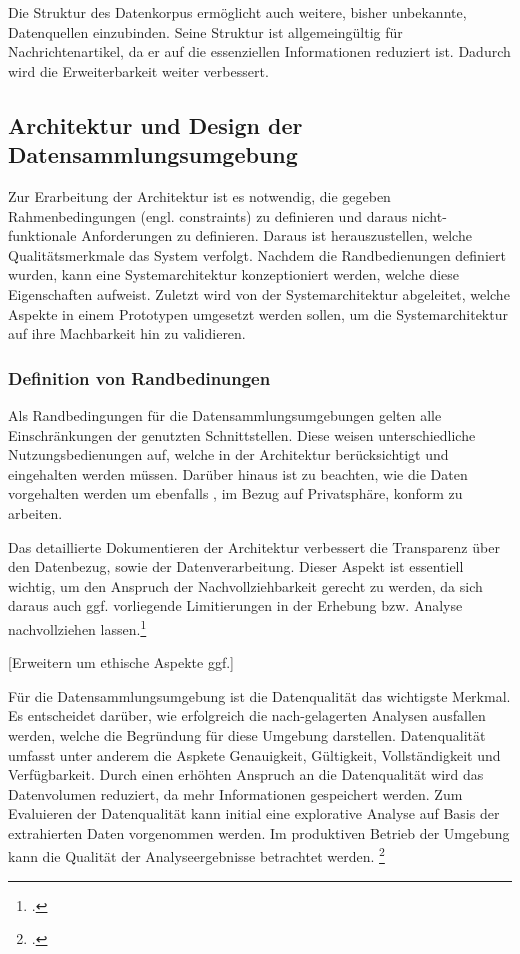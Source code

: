 Die Struktur des Datenkorpus ermöglicht auch weitere, bisher unbekannte, Datenquellen einzubinden. Seine Struktur ist allgemeingültig für Nachrichtenartikel, da er auf die essenziellen Informationen reduziert ist. 
Dadurch wird die Erweiterbarkeit weiter verbessert.

\newpage
\subsection{Architektur und Design der Datensammlungsumgebung}
Zur Erarbeitung der Architektur ist es notwendig, die gegeben Rahmenbedingungen (engl. constraints) zu definieren und daraus nicht- funktionale Anforderungen zu definieren. Daraus ist herauszustellen, welche Qualitätsmerkmale das System verfolgt. 
Nachdem die Randbedienungen definiert wurden, kann eine Systemarchitektur konzeptioniert werden, welche diese Eigenschaften aufweist. 
Zuletzt wird von der Systemarchitektur abgeleitet, welche Aspekte in einem Prototypen umgesetzt werden sollen, um die Systemarchitektur auf ihre Machbarkeit hin zu validieren.

\subsubsection{Definition von Randbedinungen}
Als  Randbedingungen für die Datensammlungsumgebungen gelten alle Einschränkungen der genutzten Schnittstellen. Diese weisen unterschiedliche Nutzungsbedienungen auf, welche in der Architektur berücksichtigt und eingehalten werden müssen. Darüber hinaus ist zu beachten, wie die Daten vorgehalten werden um ebenfalls , im Bezug auf Privatsphäre, konform zu arbeiten. 

Das detaillierte Dokumentieren der Architektur verbessert die Transparenz über den Datenbezug, sowie der Datenverarbeitung. Dieser Aspekt ist essentiell wichtig, um den Anspruch der Nachvollziehbarkeit gerecht zu werden, da sich daraus auch ggf. vorliegende Limitierungen in der Erhebung bzw. Analyse nachvollziehen lassen.\footcite[Vgl.][]{Sayogo.Challenges.2015}{}{}

[Erweitern um ethische Aspekte ggf.]

Für die Datensammlungsumgebung ist die Datenqualität das wichtigste Merkmal. Es entscheidet darüber, wie erfolgreich die nach-gelagerten Analysen ausfallen werden, welche die Begründung für diese Umgebung darstellen. Datenqualität umfasst unter anderem die Aspkete Genauigkeit, Gültigkeit, Vollständigkeit und Verfügbarkeit.
Durch einen erhöhten Anspruch an die Datenqualität wird das Datenvolumen reduziert, da mehr Informationen gespeichert werden. Zum Evaluieren der Datenqualität kann initial eine explorative Analyse auf Basis der extrahierten Daten vorgenommen werden. Im produktiven Betrieb der Umgebung kann die Qualität der Analyseergebnisse betrachtet werden. \footcite[Vgl.][]{Kilkenny.Data.2018}

